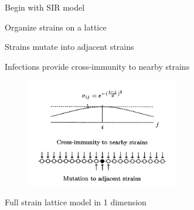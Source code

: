 \documentclass{beamer}
\begin{document}
\begin{frame}{Begin with SIR model}
    \begin{figure}
        \centering
        \scalebox{0.8}{
        
        }
    \end{figure}
\end{frame}
\begin{frame}{Organize strains on a lattice}
    \begin{figure}
        \centering
        \scalebox{0.8}{
        
        }
    \end{figure}
\end{frame}
\begin{frame}{Strains mutate into adjacent strains}
    \begin{figure}
        \centering
        \scalebox{0.8}{
        
        }
    \end{figure}
\end{frame}
\begin{frame}{Infections provide cross-immunity to nearby strains}
        \centering
            \begin{figure}
                \includegraphics[width=0.6\textwidth]{standalone/gog_fig.png}
            \end{figure}
    \centering
    \vfill
    \tiny{\cite{gogDynamicsSelectionManystrain2002}}
\end{frame}
\begin{frame}{Full strain lattice model in 1 dimension}
    \begin{figure}
        \centering
        \scalebox{0.8}{
        
        }
    \end{figure}
\end{frame}
\end{document}
